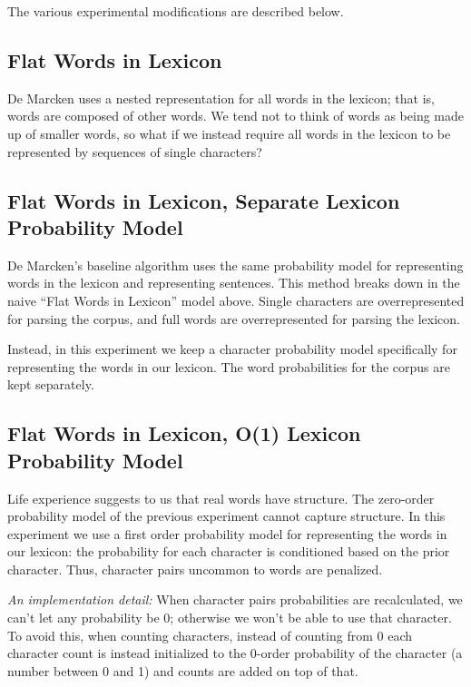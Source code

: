 \documentclass[11pt, oneside, fleqn]{article}
\begin{document}
	The various experimental modifications are described below.

  \subsection{Flat Words in Lexicon}

  De Marcken uses a nested representation for all words in the lexicon; that is, words are composed of other words. We tend not to think of words as being made up of smaller words, so what if we instead require all words in the lexicon to be represented by sequences of single characters?

  \subsection{Flat Words in Lexicon, Separate Lexicon Probability Model}

	De Marcken's baseline algorithm uses the same probability model for representing words in the lexicon and representing sentences. This method breaks down in the naive ``Flat Words in Lexicon'' model above. Single characters are overrepresented for parsing the corpus, and full words are overrepresented for parsing the lexicon.

	Instead, in this experiment we keep a character probability model specifically for representing the words in our lexicon. The word probabilities for the corpus are kept separately.

  \subsection{Flat Words in Lexicon, O(1) Lexicon Probability Model}

	Life experience suggests to us that real words have structure. The zero-order probability model of the previous experiment cannot capture structure. In this experiment we use a first order probability model for representing the words in our lexicon: the probability for each character is conditioned based on the prior character. Thus, character pairs uncommon to words are penalized.

	\textit{An implementation detail:} When character pairs probabilities are recalculated, we can't let any probability be 0; otherwise we won't be able to use that character. To avoid this, when counting characters, instead of counting from 0 each character count is instead initialized to the 0-order probability of the character (a number between 0 and 1) and counts are added on top of that.
\end{document}

